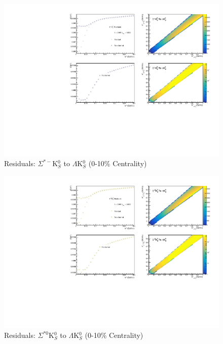 \documentclass[../AnalysisNoteJBuxton.tex]{subfiles}
\begin{document}
\begin{figure}[h]
  \centering
  \includegraphics[width=\textwidth]{9_AdditionalFigures/Figures/Residuals/LamK0/Residuals_LamK0_0010_SigStMK0_MomResCrctn_NonFlatBgdCrctn_SingleLamParam_10Res_PrimMaxDecay4fm_UsingXiDataAndCoulombOnly.pdf}
  \caption[Residuals: $\Sigma^{*-}$K$^{0}_{S}$ to $\Lambda$K$^{0}_{S}$ (0-10\% Centrality)]{Residuals: $\Sigma^{*-}$K$^{0}_{S}$ to $\Lambda$K$^{0}_{S}$ (0-10\% Centrality)}
  \label{fig:Res_LamK0_0010_SigStMK0}
\end{figure}

\begin{figure}[h]
  \centering
  \includegraphics[width=\textwidth]{9_AdditionalFigures/Figures/Residuals/LamK0/Residuals_LamK0_0010_SigSt0K0_MomResCrctn_NonFlatBgdCrctn_SingleLamParam_10Res_PrimMaxDecay4fm_UsingXiDataAndCoulombOnly.pdf}
  \caption[Residuals: $\Sigma^{*0}$K$^{0}_{S}$ to $\Lambda$K$^{0}_{S}$ (0-10\% Centrality)]{Residuals: $\Sigma^{*0}$K$^{0}_{S}$ to $\Lambda$K$^{0}_{S}$ (0-10\% Centrality)}
  \label{fig:Res_LamK0_0010_SigSt0K0}
\end{figure}
\end{document}
